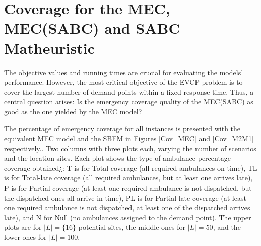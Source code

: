 \section{Coverage for the MEC, MEC(SABC) and SABC Matheuristic}

 The objective values and running times are crucial for evaluating the models' performance. However, the most critical objective of the EVCP problem is to cover the largest number of demand points within a fixed response time. Thus, a central question arises: Is the emergency coverage quality of the MEC(SABC) as good as the one yielded by the MEC model?  
 
The percentage of emergency coverage for all instances is presented with the equivalent MEC model and the SBFM in Figures \ref{Cov_MEC} and \ref{Cov_M2M1} respectively.. Two columns with three plots each, varying the number of scenarios and the location sites. Each plot shows the type of ambulance percentage coverage obtained¿: T is for Total coverage (all required ambulances on time), TL is for Total-late coverage (all required ambulances, but at least one arrives late), P is for Partial coverage (at least one required ambulance is not dispatched, but the dispatched ones all arrive in time), PL is for Partial-late coverage (at least one required ambulance is not dispatched, at least one of the dispatched arrives late), and N for Null (no ambulances assigned to the demand point). The upper plots are for  $|L|=\{16\}$ potential sites, the middle ones for $|L|=50$, and the lower ones for $|L|=100$.

